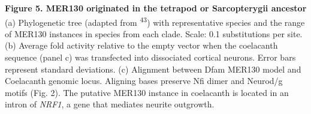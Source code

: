 \documentclass[]{article}
\begin{document}
\textbf{Figure 5. MER130 originated in the tetrapod or Sarcopterygii
ancestor} (a) Phylogenetic tree (adapted from \textsuperscript{43}) with
representative species and the range of MER130 instances in species from
each clade. Scale: 0.1 substitutions per site. (b) Average fold activity
relative to the empty vector when the coelacanth sequence (panel c) was
transfected into dissociated cortical neurons. Error bars represent
standard deviations. (c) Alignment between Dfam MER130 model and
Coelacanth genomic locus. Aligning bases preserve Nfi dimer and Neurod/g
motifs (Fig. 2). The putative MER130 instance in coelacanth is located
in an intron of \emph{NRF1}, a gene that mediates neurite outgrowth.
\end{document}
